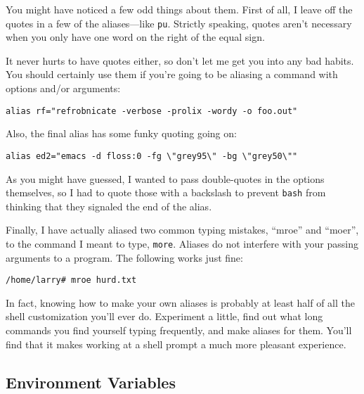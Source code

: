 You might have noticed a few odd things about them.  First of all, I
leave off the quotes in a few of the aliases---like {\tt pu}.
Strictly speaking, quotes aren't necessary when you only have one word
on the right of the equal sign. 

It never hurts to have quotes either, so don't let me get you
into any bad habits.  You should certainly use them if you're going to
be aliasing a command with options and/or arguments:

\begin{screen}\begin{verbatim}
alias rf="refrobnicate -verbose -prolix -wordy -o foo.out"
\end{verbatim}\end{screen}

Also, the final alias has some funky quoting going on:

\begin{screen}\begin{verbatim}
alias ed2="emacs -d floss:0 -fg \"grey95\" -bg \"grey50\""
\end{verbatim}\end{screen}

As you might have guessed, I wanted to pass double-quotes in the
options themselves, so I had to quote those with a backslash to
prevent {\tt bash} from thinking that they signaled the end of the
alias.

Finally, I have actually aliased two common typing mistakes, ``mroe''
and ``moer'', to the command I meant to type, {\tt more}.  Aliases do
not interfere with your passing arguments to a program. The following
works just fine:

\begin{screen}\begin{verbatim}
/home/larry# mroe hurd.txt
\end{verbatim}\end{screen}

In fact, knowing how to make your own aliases is probably at least
half of all the shell customization you'll ever do.  Experiment a
little, find out what long commands you find yourself typing
frequently, and make aliases for them.  You'll find that it makes
working at a shell prompt a much more pleasant experience.

\subsection{Environment Variables}\label{section-env-variables}

